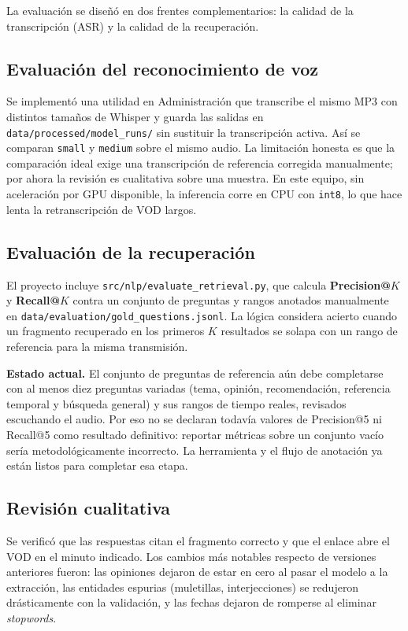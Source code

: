 \documentclass[12pt,a4paper]{article}
\begin{document}
La evaluación se diseñó en dos frentes complementarios: la calidad de la transcripción (ASR) y la calidad de la recuperación.

\subsection{Evaluación del reconocimiento de voz}

Se implementó una utilidad en Administración que transcribe el mismo MP3 con distintos tamaños de Whisper y guarda las salidas en \texttt{data/processed/model\_runs/} sin sustituir la transcripción activa. Así se comparan \texttt{small} y \texttt{medium} sobre el mismo audio. La limitación honesta es que la comparación ideal exige una transcripción de referencia corregida manualmente; por ahora la revisión es cualitativa sobre una muestra. En este equipo, sin aceleración por GPU disponible, la inferencia corre en CPU con \texttt{int8}, lo que hace lenta la retranscripción de VOD largos.

\subsection{Evaluación de la recuperación}

El proyecto incluye \texttt{src/nlp/evaluate\_retrieval.py}, que calcula \textbf{Precision@$K$} y \textbf{Recall@$K$} contra un conjunto de preguntas y rangos anotados manualmente en \texttt{data/evaluation/gold\_questions.jsonl}. La lógica considera acierto cuando un fragmento recuperado en los primeros $K$ resultados se solapa con un rango de referencia para la misma transmisión.


\textbf{Estado actual.} El conjunto de preguntas de referencia aún debe completarse con al menos diez preguntas variadas (tema, opinión, recomendación, referencia temporal y búsqueda general) y sus rangos de tiempo reales, revisados escuchando el audio. Por eso no se declaran todavía valores de Precision@5 ni Recall@5 como resultado definitivo: reportar métricas sobre un conjunto vacío sería metodológicamente incorrecto. La herramienta y el flujo de anotación ya están listos para completar esa etapa.

\subsection{Revisión cualitativa}

Se verificó que las respuestas citan el fragmento correcto y que el enlace abre el VOD en el minuto indicado. Los cambios más notables respecto de versiones anteriores fueron: las opiniones dejaron de estar en cero al pasar el modelo a la extracción, las entidades espurias (muletillas, interjecciones) se redujeron drásticamente con la validación, y las fechas dejaron de romperse al eliminar \emph{stopwords}.
\end{document}
